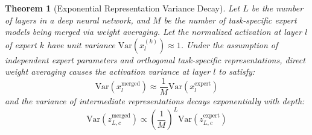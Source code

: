 \documentclass{article}
\theoremstyle{plain}
\newtheorem{theorem}{Theorem}[section]
\theoremstyle{definition}
\theoremstyle{remark}
\begin{document}
\begin{theorem}[Exponential Representation Variance Decay]
\label{thm:decay}
Let $L$ be the number of layers in a deep neural network, and $M$ be the number of task-specific expert models being merged via weight averaging. Let the normalized activation at layer $l$ of expert $k$ have unit variance $\text{Var}(x_l^{(k)}) \approx 1$. Under the assumption of independent expert parameters and orthogonal task-specific representations, direct weight averaging causes the activation variance at layer $l$ to satisfy:
\begin{equation}
\text{Var}(x_l^{\text{merged}}) \approx \frac{1}{M} \text{Var}(x_l^{\text{expert}})
\end{equation}
and the variance of intermediate representations decays exponentially with depth:
\begin{equation}
\text{Var}(z_{L,c}^{\text{merged}}) \propto \left( \frac{1}{M} \right)^L \text{Var}(z_{L,c}^{\text{expert}})
\end{equation}
\end{theorem}
\end{document}
